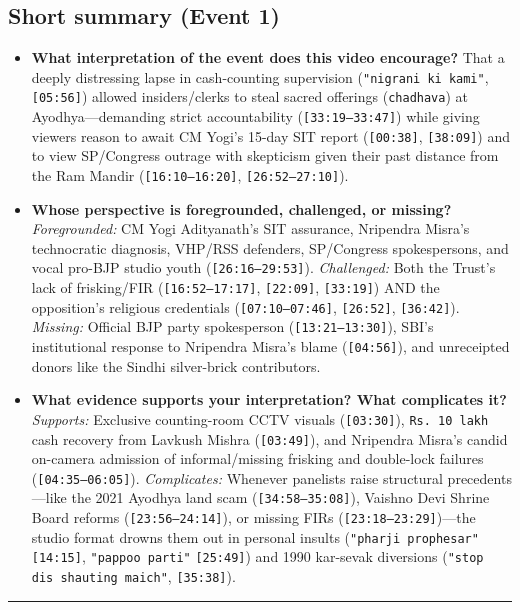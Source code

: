\documentclass[10pt,a4paper]{article}
\begin{document}
\subsection*{Short summary (Event 1)}
\begin{itemize}[leftmargin=1.5em, itemsep=3pt, topsep=4pt]
  \item \textbf{What interpretation of the event does this video encourage?} That a deeply distressing lapse in cash-counting supervision (\texttt{"nigrani ki kami"}, \texttt{[05:56]}) allowed insiders/clerks to steal sacred offerings (\texttt{chadhava}) at Ayodhya---demanding strict accountability (\texttt{[33:19--33:47]}) while giving viewers reason to await CM Yogi's 15-day SIT report (\texttt{[00:38]}, \texttt{[38:09]}) and to view SP/Congress outrage with skepticism given their past distance from the Ram Mandir (\texttt{[16:10--16:20]}, \texttt{[26:52--27:10]}).
  \item \textbf{Whose perspective is foregrounded, challenged, or missing?} \textit{Foregrounded:} CM Yogi Adityanath's SIT assurance, Nripendra Misra's technocratic diagnosis, VHP/RSS defenders, SP/Congress spokespersons, and vocal pro-BJP studio youth (\texttt{[26:16--29:53]}). \textit{Challenged:} Both the Trust's lack of frisking/FIR (\texttt{[16:52--17:17]}, \texttt{[22:09]}, \texttt{[33:19]}) AND the opposition's religious credentials (\texttt{[07:10--07:46]}, \texttt{[26:52]}, \texttt{[36:42]}). \textit{Missing:} Official BJP party spokesperson (\texttt{[13:21--13:30]}), SBI's institutional response to Nripendra Misra's blame (\texttt{[04:56]}), and unreceipted donors like the Sindhi silver-brick contributors.
  \item \textbf{What evidence supports your interpretation? What complicates it?} \textit{Supports:} Exclusive counting-room CCTV visuals (\texttt{[03:30]}), \texttt{Rs.\,10 lakh} cash recovery from Lavkush Mishra (\texttt{[03:49]}), and Nripendra Misra's candid on-camera admission of informal/missing frisking and double-lock failures (\texttt{[04:35--06:05]}). \textit{Complicates:} Whenever panelists raise structural precedents---like the 2021 Ayodhya land scam (\texttt{[34:58--35:08]}), Vaishno Devi Shrine Board reforms (\texttt{[23:56--24:14]}), or missing FIRs (\texttt{[23:18--23:29]})---the studio format drowns them out in personal insults (\texttt{"pharji prophesar"} \texttt{[14:15]}, \texttt{"pappoo parti"} \texttt{[25:49]}) and 1990 kar-sevak diversions (\texttt{"stop dis shauting maich"}, \texttt{[35:38]}).
\end{itemize}
\vspace{4pt}\noindent\rule{\textwidth}{0.4pt}\vspace{4pt}
\end{document}
